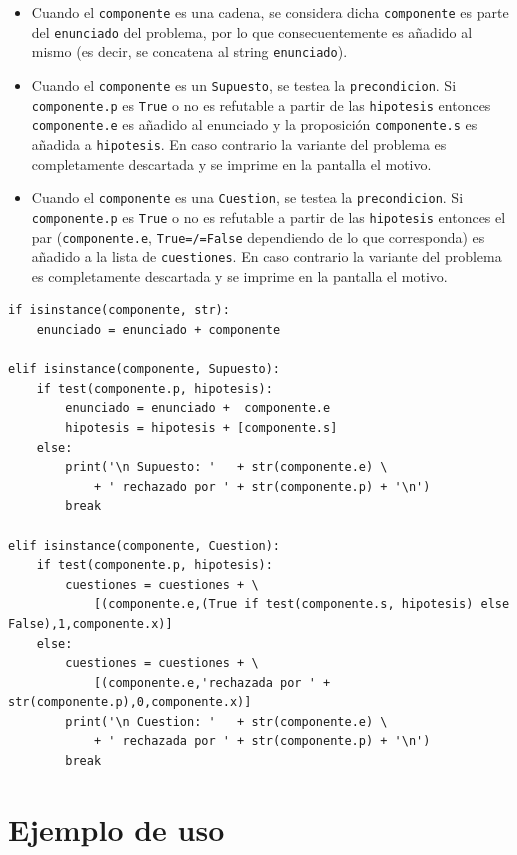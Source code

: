 \documentclass[10pt,a4paper]{report}
\begin{document}
\label{Tratamiento en función del tipo de componente}
\begin{itemize}
\item Cuando el \texttt{componente} es una cadena, se considera dicha \texttt{componente} es parte del \texttt{enunciado} del problema, por lo que consecuentemente es añadido al mismo (es decir, se concatena al string \texttt{enunciado}).
\item Cuando el \texttt{componente} es un \texttt{Supuesto}, se testea la \texttt{precondicion}. 
Si \texttt{componente.p} es \texttt{True} o no es refutable a partir de las \texttt{hipotesis} entonces \texttt{componente.e} es añadido al enunciado y la proposición \texttt{componente.s} es añadida a \texttt{hipotesis}. 
En caso contrario la variante del problema es completamente descartada y se imprime en la pantalla el motivo.
\item Cuando el \texttt{componente} es una \texttt{Cuestion}, se testea la  \texttt{precondicion}. 
Si \texttt{componente.p} es \texttt{True} o no es refutable a partir de las \texttt{hipotesis} entonces el par (\texttt{componente.e}, \texttt{True=/=False} dependiendo de lo que corresponda) es añadido a la lista de \texttt{cuestiones}. 
En caso contrario la variante del problema es completamente descartada y se imprime en la pantalla el motivo.
\end{itemize}

\label{Tratamiento en función del tipo de componente}
\begin{verbatim}
if isinstance(componente, str):
    enunciado = enunciado + componente
    
elif isinstance(componente, Supuesto):
    if test(componente.p, hipotesis):
        enunciado = enunciado +  componente.e
        hipotesis = hipotesis + [componente.s]
    else:
        print('\n Supuesto: '   + str(componente.e) \
            + ' rechazado por ' + str(componente.p) + '\n')
        break
    
elif isinstance(componente, Cuestion):
    if test(componente.p, hipotesis):
        cuestiones = cuestiones + \
            [(componente.e,(True if test(componente.s, hipotesis) else False),1,componente.x)]
    else:
        cuestiones = cuestiones + \
            [(componente.e,'rechazada por ' + str(componente.p),0,componente.x)]
        print('\n Cuestion: '   + str(componente.e) \
            + ' rechazada por ' + str(componente.p) + '\n')
        break
\end{verbatim}
\section{Ejemplo de uso}
\label{sec:orgf1c76aa}
\end{document}
